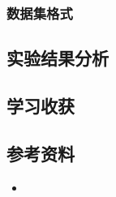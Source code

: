 \documentclass{ctexart}
\begin{document}
	\subsubsection{数据集格式}
	
	\subsection{实验结果分析}

	\subsection{学习收获}

	
	\subsection{参考资料}
	\begin{itemize}
		\item
	\end{itemize}
\end{document}
